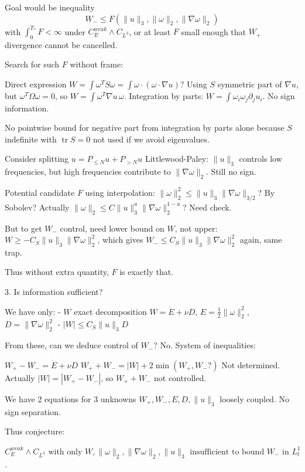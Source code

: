 \documentclass[11pt]{article}
\begin{document}
Goal would be inequality
\begin{equation*}
\boxed{W_-\le F(\|u\|_3,\|\omega\|_2,\|\nabla\omega\|_2)}
\end{equation*}
with $\int_0^{T_*}F<\infty$ under $C_E^{weak}\land C_{L^3}$, or at least $F$ small enough that $W_+$ divergence cannot be cancelled.

Search for such $F$ without frame:

Direct expression $W=\int\omega^T S\omega = \int \omega\cdot(\omega\cdot\nabla u)$? Using $S$ symmetric part of $\nabla u$, but $\omega^T\Omega\omega=0$, so $W=\int\omega^T\nabla u\,\omega$. Integration by parts:
$W=\int \omega_i \omega_j \partial_j u_i$.
No sign information.

No pointwise bound for negative part from integration by parts alone because $S$ indefinite with $\operatorname{tr}S=0$ not used if we avoid eigenvalues.

Consider splitting $u=P_{\le N}u+P_{>N}u$ Littlewood-Paley: $\|u\|_3$ controls low frequencies, but high frequencies contribute to $\|\nabla\omega\|_2$. Still no sign.

Potential candidate $F$ using interpolation: $\|\omega\|_2^2\le \|u\|_3\|\nabla\omega\|_{3/2}$? By Sobolev? Actually $\|\omega\|_2\le C\|u\|_3^{a}\|\nabla\omega\|_2^{1-a}$? Need check.

But to get $W_-$ control, need lower bound on $W$, not upper: $W\ge -C_S\|u\|_3\|\nabla\omega\|_2^2$, which gives $W_-\le C_S\|u\|_3\|\nabla\omega\|_2^2$ again, same trap.

Thus without extra quantity, $F$ is exactly that.

3. Is information sufficient?

We have only:
- $W$ exact decomposition $W=\dot E+\nu D$, $E=\frac12\|\omega\|_2^2$, $D=\|\nabla\omega\|_2^2$
- $|W|\le C_S\|u\|_3 D$

From these, can we deduce control of $W_-$? No. System of inequalities:

$W_+-W_- = \dot E+\nu D$
$W_++W_- = |W| +2\min(W_+,W_-?) $ Not determined. Actually $|W|=|W_+-W_-|$, so $W_++W_-$ not controlled.

We have 2 equations for 3 unknowns $W_+,W_-,E,D,\|u\|_3$ loosely coupled. No sign separation.

Thus conjecture:

$\boxed{C_E^{weak}\land C_{L^3}\text{ with only }W,\|\omega\|_2,\|\nabla\omega\|_2,\|u\|_3\text{ insufficient to bound }W_-\text{ in }L^1_t}$.
\end{document}
